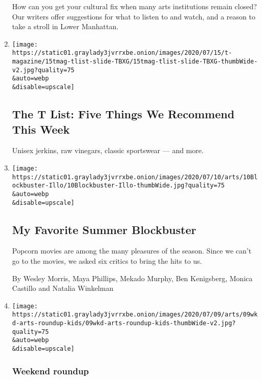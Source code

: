 \begin{enumerate}
  How can you get your cultural fix when many arts institutions remain
  closed? Our writers offer suggestions for what to listen to and watch,
  and a reason to take a stroll in Lower Manhattan.
\item
  \href{/2020/07/16/t-magazine/margo-price-album-tlist.html}{}

  \texttt{[image: https://static01.graylady3jvrrxbe.onion/images/2020/07/15/t-magazine/15tmag-tlist-slide-TBXG/15tmag-tlist-slide-TBXG-thumbWide-v2.jpg?quality=75\\\&auto=webp\\\&disable=upscale]}

  \hypertarget{the-t-list-five-things-we-recommend-this-week-2}{%
  \subsection{The T List: Five Things We Recommend This
  Week}\label{the-t-list-five-things-we-recommend-this-week-2}}

  Unisex jerkins, raw vinegars, classic sportswear --- and more.
\item
  \href{/2020/07/09/movies/summer-movies-blockbusters.html}{}

  \texttt{[image: https://static01.graylady3jvrrxbe.onion/images/2020/07/10/arts/10Blockbuster-Illo/10Blockbuster-Illo-thumbWide.jpg?quality=75\\\&auto=webp\\\&disable=upscale]}

  \hypertarget{my-favorite-summer-blockbuster}{%
  \subsection{My Favorite Summer
  Blockbuster}\label{my-favorite-summer-blockbuster}}

  Popcorn movies are among the many pleasures of the season. Since we
  can't go to the movies, we asked six critics to bring the hits to us.

  By Wesley Morris, Maya Phillips, Mekado Murphy, Ben Kenigsberg, Monica
  Castillo and Natalia Winkelman
\item
  \href{/2020/07/09/arts/things-to-do-weekend-coronavirus.html}{}

  \texttt{[image: https://static01.graylady3jvrrxbe.onion/images/2020/07/09/arts/09wkd-arts-roundup-kids/09wkd-arts-roundup-kids-thumbWide-v2.jpg?quality=75\\\&auto=webp\\\&disable=upscale]}

  \hypertarget{weekend-roundup-1}{%
  \subsubsection{Weekend roundup}\label{weekend-roundup-1}}


\end{enumerate}
